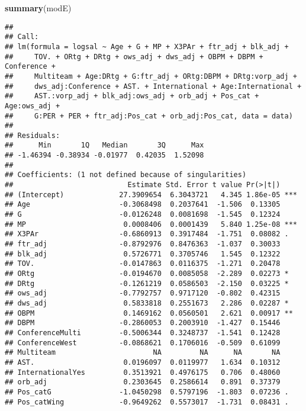 \documentclass[]{article}
\newenvironment{Shaded}{\begin{snugshade}}{\end{snugshade}}
\newcommand{\KeywordTok}[1]{\textcolor[rgb]{0.13,0.29,0.53}{\textbf{#1}}}
\newcommand{\NormalTok}[1]{#1}
\begin{document}
\begin{Shaded}
\begin{Highlighting}[]
\KeywordTok{summary}\NormalTok{(modE)}
\end{Highlighting}
\end{Shaded}

\begin{verbatim}
## 
## Call:
## lm(formula = logsal ~ Age + G + MP + X3PAr + ftr_adj + blk_adj + 
##     TOV. + ORtg + DRtg + ows_adj + dws_adj + OBPM + DBPM + Conference + 
##     Multiteam + Age:DRtg + G:ftr_adj + ORtg:DBPM + DRtg:vorp_adj + 
##     dws_adj:Conference + AST. + International + Age:International + 
##     AST.:vorp_adj + blk_adj:ows_adj + orb_adj + Pos_cat + Age:ows_adj + 
##     G:PER + PER + ftr_adj:Pos_cat + orb_adj:Pos_cat, data = data)
## 
## Residuals:
##      Min       1Q   Median       3Q      Max 
## -1.46394 -0.38934 -0.01977  0.42035  1.52098 
## 
## Coefficients: (1 not defined because of singularities)
##                           Estimate Std. Error t value Pr(>|t|)    
## (Intercept)             27.3909654  6.3043721   4.345 1.86e-05 ***
## Age                     -0.3068498  0.2037641  -1.506  0.13305    
## G                       -0.0126248  0.0081698  -1.545  0.12324    
## MP                       0.0008406  0.0001439   5.840 1.25e-08 ***
## X3PAr                   -0.6860913  0.3917484  -1.751  0.08082 .  
## ftr_adj                 -0.8792976  0.8476363  -1.037  0.30033    
## blk_adj                  0.5726771  0.3705746   1.545  0.12322    
## TOV.                    -0.0147863  0.0116375  -1.271  0.20478    
## ORtg                    -0.0194670  0.0085058  -2.289  0.02273 *  
## DRtg                    -0.1261219  0.0586503  -2.150  0.03225 *  
## ows_adj                 -0.7792757  0.9717120  -0.802  0.42315    
## dws_adj                  0.5833818  0.2551673   2.286  0.02287 *  
## OBPM                     0.1469162  0.0560501   2.621  0.00917 ** 
## DBPM                    -0.2860053  0.2003910  -1.427  0.15446    
## ConferenceMulti         -0.5006344  0.3248737  -1.541  0.12428    
## ConferenceWest          -0.0868621  0.1706016  -0.509  0.61099    
## Multiteam                       NA         NA      NA       NA    
## AST.                     0.0196097  0.0119977   1.634  0.10312    
## InternationalYes         0.3513921  0.4976175   0.706  0.48060    
## orb_adj                  0.2303645  0.2586614   0.891  0.37379    
## Pos_catG                -1.0450298  0.5797196  -1.803  0.07236 .  
## Pos_catWing             -0.9649262  0.5573017  -1.731  0.08431 .  

\end{verbatim}
\end{document}
